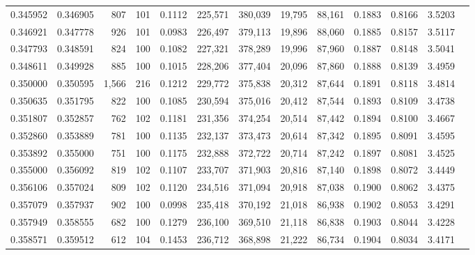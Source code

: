 \begin{tabular}{rrrrrrrrrrrrr}
0.345952 & 0.346905 &    807 &   101 &                                     0.1112 & 225,571 & 380,039 &  19,795 &  88,161 & 0.1883 & 0.8166 & 3.5203 \\
0.346921 & 0.347778 &    926 &   101 &                                     0.0983 & 226,497 & 379,113 &  19,896 &  88,060 & 0.1885 & 0.8157 & 3.5117 \\
0.347793 & 0.348591 &    824 &   100 &                                     0.1082 & 227,321 & 378,289 &  19,996 &  87,960 & 0.1887 & 0.8148 & 3.5041 \\
0.348611 & 0.349928 &    885 &   100 &                                     0.1015 & 228,206 & 377,404 &  20,096 &  87,860 & 0.1888 & 0.8139 & 3.4959 \\
0.350000 & 0.350595 &  1,566 &   216 &                                     0.1212 & 229,772 & 375,838 &  20,312 &  87,644 & 0.1891 & 0.8118 & 3.4814 \\
0.350635 & 0.351795 &    822 &   100 &                                     0.1085 & 230,594 & 375,016 &  20,412 &  87,544 & 0.1893 & 0.8109 & 3.4738 \\
0.351807 & 0.352857 &    762 &   102 &                                     0.1181 & 231,356 & 374,254 &  20,514 &  87,442 & 0.1894 & 0.8100 & 3.4667 \\
0.352860 & 0.353889 &    781 &   100 &                                     0.1135 & 232,137 & 373,473 &  20,614 &  87,342 & 0.1895 & 0.8091 & 3.4595 \\
0.353892 & 0.355000 &    751 &   100 &                                     0.1175 & 232,888 & 372,722 &  20,714 &  87,242 & 0.1897 & 0.8081 & 3.4525 \\
0.355000 & 0.356092 &    819 &   102 &                                     0.1107 & 233,707 & 371,903 &  20,816 &  87,140 & 0.1898 & 0.8072 & 3.4449 \\
0.356106 & 0.357024 &    809 &   102 &                                     0.1120 & 234,516 & 371,094 &  20,918 &  87,038 & 0.1900 & 0.8062 & 3.4375 \\
0.357079 & 0.357937 &    902 &   100 &                                     0.0998 & 235,418 & 370,192 &  21,018 &  86,938 & 0.1902 & 0.8053 & 3.4291 \\
0.357949 & 0.358555 &    682 &   100 &                                     0.1279 & 236,100 & 369,510 &  21,118 &  86,838 & 0.1903 & 0.8044 & 3.4228 \\
0.358571 & 0.359512 &    612 &   104 &                                     0.1453 & 236,712 & 368,898 &  21,222 &  86,734 & 0.1904 & 0.8034 & 3.4171 \\

\end{tabular}
